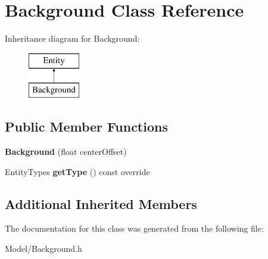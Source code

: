 \hypertarget{class_background}{}\section{Background Class Reference}
\label{class_background}
Inheritance diagram for Background\+:\begin{figure}[H]
\begin{center}
\leavevmode
\includegraphics[height=2.000000cm]{class_background}
\end{center}
\end{figure}
\subsection*{Public Member Functions}
\begin{DoxyCompactItemize}
\item 
\mbox{\label{class_background_a4e2392dc131ffee9384bbd65f49821cf}} 
{\bfseries Background} (float center\+Offset)
\item 
\mbox{\label{class_background_af2356a6def94418c41c8ea8982186e68}} 
Entity\+Types {\bfseries get\+Type} () const override
\end{DoxyCompactItemize}
\subsection*{Additional Inherited Members}


The documentation for this class was generated from the following file\+:\begin{DoxyCompactItemize}
\item 
Model/Background.\+h\end{DoxyCompactItemize}
